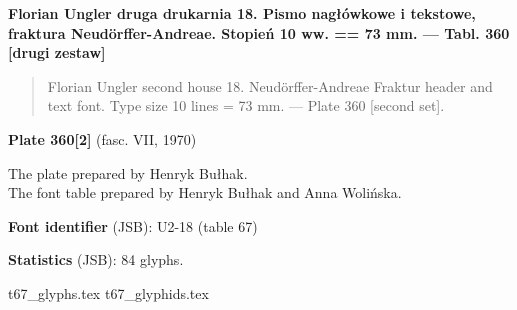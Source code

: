 \documentclass[12pt]{article}
\newcommand{\bg}{\begingl}
\newcommand{\pismoPL}[1]{{\relsize{2}\Junicode\textbf{#1}}}
\newcommand{\pismoEN}[1]{{\relsize{1}\Junicode\begin{quote}#1\end{quote}}}
\newcommand{\plate}[3]{\textbf{Plate #1} (fasc. #2, #3)}
\newcommand{\exampleBib}[1]{{\relsize{2}\Junicode\textbf{The
      example:}\\[2ex] CATALOGUS LIBRORUM \textbf{#1}}}
\newcommand{\exampleDesc}[1]{{\relsize{0}\Junicode#1}}
\newcommand{\exampleDig}[1]{{\relsize{0}\Junicode \textbf{Digitization(s) [JSB]:} #1}}
\newcommand{\exampleLib}[1]{{\relsize{0}\Junicode \textbf{Library:} #1}}
\newcommand{\fontID}[2]{{\relsize{1}\Junicode\textbf{Font identifier} (JSB): #1 (table #2)}}
\newcommand{\fontstat}[1]{{\relsize{1}\Junicode\textbf{Statistics} (JSB): #1 glyphs.}}
\newcommand{\exampleRef}[1]{{\relsize{0}\Junicode \textbf{References:} #1}}
\newcommand{\examplePage}[1]{{Page reference: \relsize{0}\Junicode#1}}
\begin{document}
 \pismoPL{Florian Ungler druga drukarnia 18. Pismo nagłówkowe i
   tekstowe, fraktura Neudörffer-Andreae. Stopień 10 ww. == 73 mm. —
   Tabl. 360 [drugi zestaw]}
  
 \pismoEN{Florian Ungler second house 18. Neudörffer-Andreae Fraktur
   header and text font. Type size 10 lines = 73 mm. — Plate 360
   [second set].}

\plate{360[2]}{VII}{1970}

The plate prepared by Henryk Bułhak.\\
The font table prepared by Henryk Bułhak and Anna Wolińska.

\bigskip










\bigskip

\fontID{U2-18}{67}

\fontstat{84}

  {t67_glyphs.tex}
  {t67_glyphids.tex}



 \newpage
 
% 

 
\end{document}

